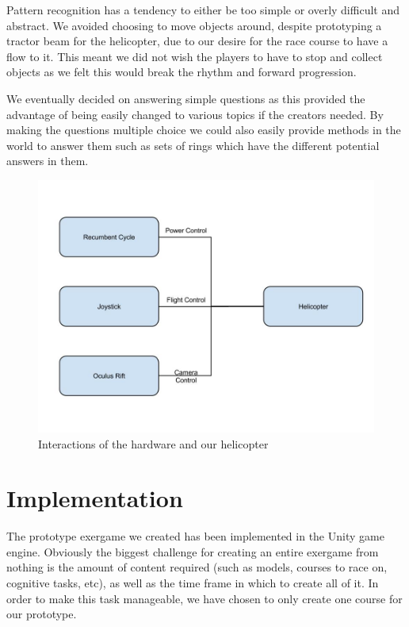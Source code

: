 \documentclass[11pt, 
]{IEEEtran}
\begin{document}
Pattern recognition has a tendency to either be too simple or overly difficult and abstract. We avoided choosing to move objects around, despite prototyping a tractor beam for the helicopter, due to our desire for the race course to have a flow to it. This meant we did not wish the players to have to stop and collect objects as we felt this would break the rhythm and forward progression. 

We eventually decided on answering simple questions as this provided the advantage of being easily changed to various topics if the creators needed. By making the questions multiple choice we could also easily provide methods in the world to answer them such as sets of rings which have the different potential answers in them.

\begin{figure}[tb]
	\centering
		\includegraphics[width=1\columnwidth]{Diagram.jpg}
	\caption{Interactions of the hardware and our helicopter}
	\label{fig:helicopter}
\end{figure}

\section{Implementation} \label{Implementation}

The prototype exergame we created has been implemented in the Unity game engine. Obviously the biggest challenge for creating an entire exergame from nothing is the amount of content required (such as models, courses to race on, cognitive tasks, etc), as well as the time frame in which to create all of it. In order to make this task manageable, we have chosen to only create one course for our prototype.
\end{document}
